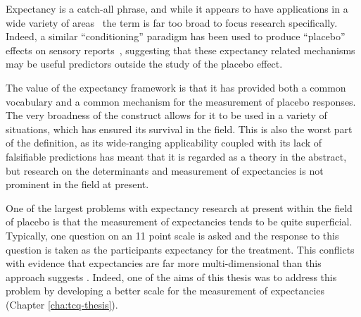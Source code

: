 Expectancy is a catch-all phrase, and while it appears to have applications in a wide variety of areas~\cite{Montgomery2007} the term is far too broad to focus research specifically. Indeed, a similar ``conditioning'' paradigm has been used to produce ``placebo'' effects on sensory reports~\cite{Sterzer2008}, suggesting that these expectancy related mechanisms may be useful predictors outside the study of the placebo effect. 








The value of the expectancy framework is that it has provided both a common vocabulary and a common mechanism for the measurement of placebo responses. The very broadness of the construct allows for it to be used in a variety of situations, which has ensured its survival in the field. This is also the worst part of the definition, as its wide-ranging applicability coupled with its lack of falsifiable predictions has meant that it is regarded as a theory in the abstract, but research on the determinants and measurement of expectancies is not prominent in the field at present.

One of the largest problems with expectancy research at present within the field of placebo is that the measurement of expectancies tends to be quite superficial. Typically, one question on an 11 point scale is asked and the response to this question is taken as the participants expectancy for the treatment. This conflicts with evidence that expectancies are far more multi-dimensional than this approach suggests \cite{Stone2005}. Indeed, one of the aims of this thesis was to address this problem by developing a better scale for the measurement of expectancies (Chapter \ref{cha:tcq-thesis}). 


